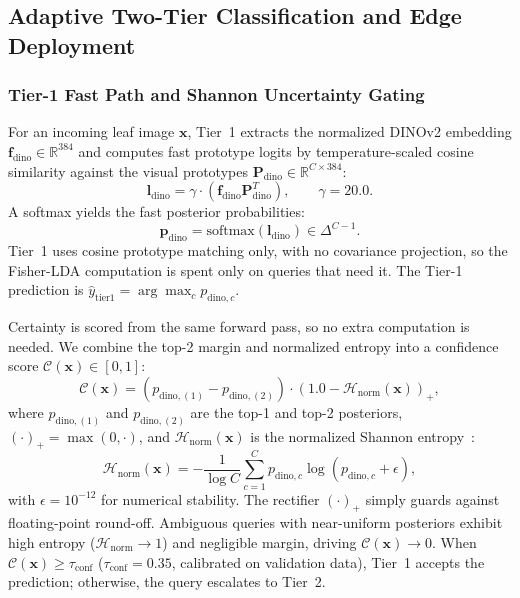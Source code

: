 \subsection{Adaptive Two-Tier Classification and Edge Deployment}
\label{sec:edge_cascade}

\subsubsection{Tier-1 Fast Path and Shannon Uncertainty Gating}
For an incoming leaf image $\mathbf{x}$, Tier~1 extracts the normalized DINOv2 embedding $\mathbf{f}_{\text{dino}} \in \mathbb{R}^{384}$ and computes fast prototype logits by temperature-scaled cosine similarity against the visual prototypes $\mathbf{P}_{\text{dino}} \in \mathbb{R}^{C \times 384}$:
\begin{equation}
    \label{eq:tier1_logits}
    \mathbf{l}_{\text{dino}} = \gamma \cdot \left(\mathbf{f}_{\text{dino}} \mathbf{P}_{\text{dino}}^T\right), \qquad \gamma = 20.0.
\end{equation}
A softmax yields the fast posterior probabilities:
\begin{equation}
    \label{eq:tier1_softmax}
    \mathbf{p}_{\text{dino}} = \text{softmax}(\mathbf{l}_{\text{dino}}) \in \Delta^{C-1}.
\end{equation}
Tier~1 uses cosine prototype matching only, with no covariance projection, so the Fisher-LDA computation is spent only on queries that need it. The Tier-1 prediction is $\hat{y}_{\text{tier1}} = \arg\max_c p_{\text{dino}, c}$.

Certainty is scored from the same forward pass, so no extra computation is needed. We combine the top-2 margin and normalized entropy into a confidence score $\mathcal{C}(\mathbf{x}) \in [0, 1]$:
\begin{equation}
    \label{eq:shannon_gate}
    \mathcal{C}(\mathbf{x}) = \left(p_{\text{dino}, (1)} - p_{\text{dino}, (2)}\right) \cdot \left(1.0 - \mathcal{H}_{\text{norm}}(\mathbf{x})\right)_+,
\end{equation}
where $p_{\text{dino}, (1)}$ and $p_{\text{dino}, (2)}$ are the top-1 and top-2 posteriors, $(\cdot)_+ = \max(0, \cdot)$, and $\mathcal{H}_{\text{norm}}(\mathbf{x})$ is the normalized Shannon entropy~\cite{shannon1948mathematical}:
\begin{equation}
    \mathcal{H}_{\text{norm}}(\mathbf{x}) = -\frac{1}{\log C}\sum_{c=1}^C p_{\text{dino}, c}\log(p_{\text{dino}, c} + \epsilon),
\end{equation}
with $\epsilon = 10^{-12}$ for numerical stability. The rectifier $(\cdot)_+$ simply guards against floating-point round-off. Ambiguous queries with near-uniform posteriors exhibit high entropy ($\mathcal{H}_{\text{norm}} \to 1$) and negligible margin, driving $\mathcal{C}(\mathbf{x}) \to 0$. When $\mathcal{C}(\mathbf{x}) \ge \tau_{\text{conf}}$ ($\tau_{\text{conf}} = 0.35$, calibrated on validation data), Tier~1 accepts the prediction; otherwise, the query escalates to Tier~2.

